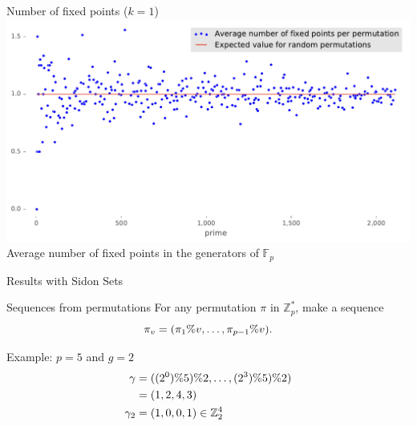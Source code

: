 \begin{frame}{Number of fixed points ($k=1$)}
        \centering
        \includegraphics[width=\textwidth]{figures/average_number_of_fixed_points_per_permutation}\\
{Average number of fixed points in the generators of $\mathbb{F}_p$}
\end{frame}


\begin{frame}{Results with Sidon Sets}
\end{frame}



\begin{frame}{Sequences from permutations}
    For any  permutation $\pi$ in $\mathbb{Z}_p^*$, make a sequence
    \[
        \pi_v = (\pi_1 \% v, \ldots, \pi_{p-1}\% v).
    \]
    
    \pause

    Example:  $p=5$ and $g=2$
    \begin{align*}            \gamma &= ( (2^0) \% 5) \% 2, \ldots, (2^3) \% 5) \% 2)\\
      &= (1, 2, 4, 3) \\
        \gamma_2 &= (1, 0, 0, 1) \in \mathbb{Z}_2^4
    \end{align*}
\end{frame}


